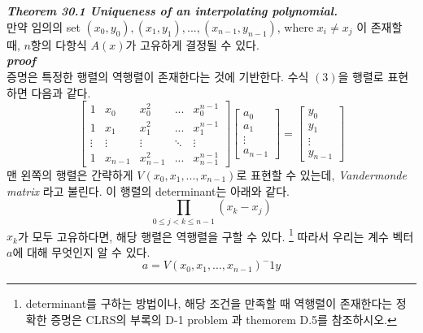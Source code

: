 \documentclass{article}
\begin{document}
\\\\
\textbf{\textit{Theorem 30.1 Uniqueness of an interpolating polynomial.}}
\\
만약 임의의 set ${(x_0, y_0), (x_1, y_1), ... , (x_{n-1}, y_{n-1})}$, where $x_i \ne x_j$ 이 존재할 때, $n$항의 다항식 $A(x)$가 고유하게 결정될 수 있다.
\\
\textbf{\textit{proof}}
\\
증명은 특정한 행렬의 역행렬이 존재한다는 것에 기반한다. 수식 $(3)$을 행렬로 표현하면 다음과 같다.
\\
\[
\begin{bmatrix}
    1 & x_0 & x_0^2 &... &x_0^{n-1}\\
    1 & x_1 & x_1^2 &... &x_1^{n-1}\\
    \vdots &\vdots &\vdots &\ddots &\vdots\\
    1 & x_{n-1} & x^2_{n-1} &... &x_{n-1}^{n-1}
\end{bmatrix}
\begin{bmatrix}
    a_0\\
    a_1\\
    \vdots\\
    a_{n-1}
\end{bmatrix}
=
\begin{bmatrix}
    y_0\\
    y_1\\
    \vdots\\
    y_{n-1}
\end{bmatrix}
\tag{4}
\]
맨 왼쪽의 행렬은 간략하게 $V(x_0, x_1, ..., x_{n-1})$로 표현할 수 있는데, \textit{Vandermonde matrix} 라고 불린다. 이 행렬의 determinant는 아래와 같다.
\\
$$
\prod_{0 \le j < k \le n-1}(x_k - x_j)
$$
$x_k$가 모두 고유하다면, 해당 행렬은 역행렬을 구할 수 있다. 
\footnote{determinant를 구하는 방법이나, 해당 조건을 만족할 때 역행렬이 존재한다는 정확한 증명은 CLRS의 부록의 D-1 problem 과 themorem D.5를 참조하시오.} 따라서 우리는 계수 벡터 $a$에 대해 무엇인지 알 수 있다.
\[
a = V(x_0, x_1, ... ,x_{n-1})^-1y\tag{5}
\]
\end{document}
